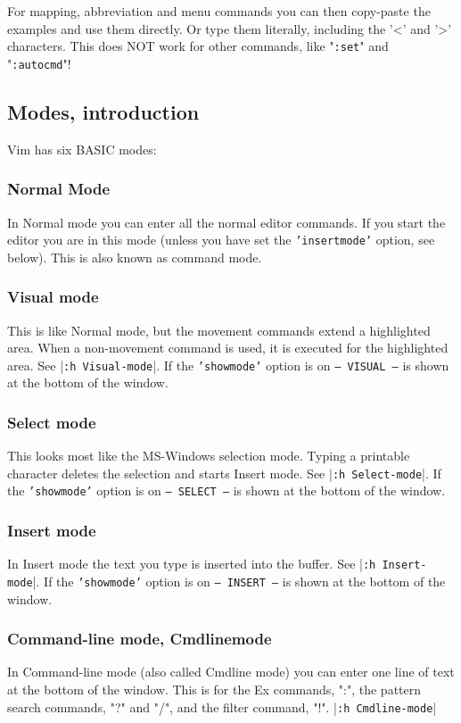 For mapping, abbreviation and menu commands you can then copy-paste the examples and use them directly.
Or type them literally, including the '<' and '>' characters.
This does NOT work for other commands, like "\texttt{:set}" and "\texttt{:autocmd}"!

\subsection{Modes, introduction}
\label{vim-modes-intro}
\label{vim-modes}
Vim has six BASIC modes:

\subsubsection{Normal Mode}
\label{Normal}
\label{Normal-mode}
\label{command-mode}
In Normal mode you can enter all the normal editor commands.
If you start the editor you are in this mode (unless you have set the \texttt{'insertmode'} option, see below).
This is also known as command mode.

\subsubsection{Visual mode}
This is like Normal mode, but the movement commands extend a highlighted area.
When a non-movement command is used, it is executed for the highlighted area.
See |\texttt{:h Visual-mode}|.
If the \texttt{'showmode'} option is on \texttt{-- VISUAL --} is shown
at the bottom of the window.

\subsubsection{Select mode}
This looks most like the MS-Windows selection mode.
Typing a printable character deletes the selection and starts Insert mode.
See |\texttt{:h Select-mode}|.
If the \texttt{'showmode'} option is on \texttt{-- SELECT --} is shown at the bottom of the window.

\subsubsection{Insert mode}
In Insert mode the text you type is inserted into the buffer.
See |\texttt{:h Insert-mode}|.
If the \texttt{'showmode'} option is on \texttt{-- INSERT --} is shown at the bottom of the window.

\subsubsection{Command-line mode, Cmdlinemode}
In Command-line mode (also called Cmdline mode) you can enter one line of text at the bottom of the window.
This is for the Ex commands, ":", the pattern search commands, "?" and "/", and the filter command, "!".
|\texttt{:h Cmdline-mode}|

